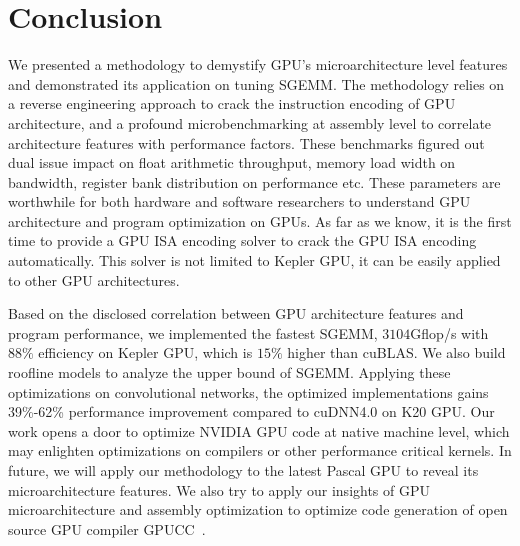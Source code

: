 \section{Conclusion}
\label{sec:conclusion}
We presented a methodology to demystify GPU's microarchitecture level features and demonstrated its 
application on tuning SGEMM. The methodology relies on a reverse engineering approach to crack the instruction encoding 
of GPU architecture, and a profound microbenchmarking at assembly level to correlate architecture features with 
performance factors. These benchmarks figured out dual issue impact on float arithmetic throughput, memory load width on bandwidth, register 
bank distribution on performance etc. These parameters are worthwhile for both hardware and software researchers to 
understand GPU architecture and program optimization on GPUs. 
As far as we know, it is the first time to provide a GPU ISA encoding solver to crack the GPU ISA encoding automatically. 
This solver is not limited to Kepler GPU, it can be easily applied to other GPU architectures. 

Based on the disclosed correlation between GPU architecture features and program performance, we implemented the
fastest SGEMM,  $3104$Gflop/s with $88\%$ efficiency on Kepler GPU, which is $15\%$ higher than cuBLAS. 
We also build roofline models to analyze the upper bound of SGEMM. 
Applying these optimizations on convolutional networks, the optimized implementations gains 39\%-62\% performance improvement
compared to cuDNN4.0 on K20 GPU.
Our work opens a door to optimize NVIDIA GPU code at native machine level, which may enlighten optimizations on
compilers or other performance critical kernels.
In future, we will apply our methodology to the latest Pascal GPU to reveal its microarchitecture features.
We also try to apply our insights of GPU microarchitecture and assembly optimization to optimize code generation of open source GPU compiler
GPUCC~\cite{wu2016gpucc}.
